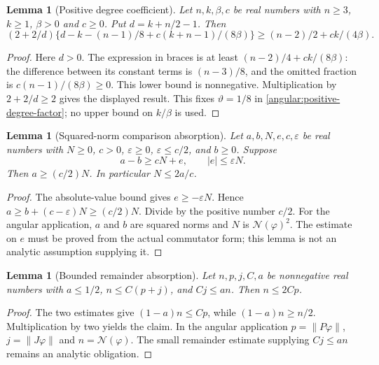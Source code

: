 \documentclass[11pt]{article}
\newtheorem{lemma}[theorem]{Lemma}
\theoremstyle{definition}
\theoremstyle{remark}
\numberwithin{equation}{section}
\begin{document}
\begin{lemma}[Positive degree coefficient]\label{formal-components:degree}
Let $n,k,\beta,c$ be real numbers with $n\ge3$, $k\ge1$, $\beta>0$ and
$c\ge0$. Put $d=k+n/2-1$. Then
\[
 (2+2/d)\{d-k-(n-1)/8+c(k+n-1)/(8\beta)\}
 \ge (n-2)/2+ck/(4\beta).
\]
\end{lemma}
\begin{proof}
Here $d>0$. The expression in braces is at least
$(n-2)/4+ck/(8\beta)$: the difference between its constant terms is
$(n-3)/8$, and the omitted fraction is $c(n-1)/(8\beta)\ge0$.
This lower bound is nonnegative. Multiplication by $2+2/d\ge2$ gives
the displayed result. This fixes $\vartheta=1/8$ in
\eqref{angular:positive-degree-factor}; no upper bound on $k/\beta$ is used.
\end{proof}

\begin{lemma}[Squared-norm comparison absorption]\label{formal-components:absorption}
Let $a,b,N,e,c,\varepsilon$ be real numbers with $N\ge0$, $c>0$,
$\varepsilon\ge0$, $\varepsilon\le c/2$, and $b\ge0$. Suppose
\[
 a-b\ge cN+e,\qquad |e|\le\varepsilon N.
\]
Then $a\ge(c/2)N$. In particular $N\le2a/c$.
\end{lemma}
\begin{proof}
The absolute-value bound gives $e\ge-\varepsilon N$. Hence
$a\ge b+(c-\varepsilon)N\ge(c/2)N$. Divide by the positive number $c/2$.
For the angular application, $a$ and $b$ are squared norms and $N$ is
$\mathcal N(\varphi)^2$. The estimate on $e$ must be proved from the actual
commutator form; this lemma is not an analytic assumption supplying it.
\end{proof}

\begin{lemma}[Bounded remainder absorption]\label{formal-components:remainder}
Let $n,p,j,C,a$ be nonnegative real numbers with $a\le1/2$,
$n\le C(p+j)$, and $Cj\le an$. Then $n\le2Cp$.
\end{lemma}
\begin{proof}
The two estimates give $(1-a)n\le Cp$, while
$(1-a)n\ge n/2$. Multiplication by two yields the claim. In the
angular application $p=\|P\varphi\|$, $j=\|J\varphi\|$ and
$n=\mathcal N(\varphi)$. The small remainder estimate supplying
$Cj\le an$ remains an analytic obligation.
\end{proof}
\end{document}
